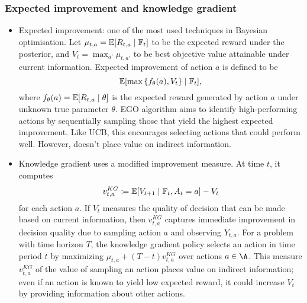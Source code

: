 \documentclass[11pt, openany]{book}
\begin{document}
\subsubsection{Expected improvement and knowledge gradient}
\begin{itemize}
    \item Expected improvement: one of the most used techniques in Bayesian optimisation. Let $\mu_{t,a} = \mathbb{E}[R_{t,a}\mid\mathbb{F}_t]$ to be the expected reward under the posterior, and $V_t = \max_{a'} \mu_{t,a'}$ to be best objective value attainable under current information. Expected improvement of action $a$ is defined to be
        \[
            \mathbb{E}[\max\left\lbrace f_\theta(a),V_t\right\rbrace\mid\mathbb{F}_t],
        \]
        where $f_\theta(a) = \mathbb{E}[R_{t,a}\mid\theta]$ is the expected reward generated by action $a$ under unknown true parameter $\theta$. EGO algorithm aims to identify high-performing actions by sequentially sampling those that yield the highest expected improvement. Like UCB, this encourages selecting actions that could perform well. However, doesn't place value on indirect information.
    \item Knowledge gradient uses a modified improvement measure. At time $t$, it computes
        \[
            v_{t,a}^{KG} \coloneq \mathbb{E}[V_{t+1}\mid\mathbb{F}_t,A_t=a] - V_t
        \]
    for each action $a$. If $V_t$ measures the quality of decision that can be made based on current information, then $v_{t,a}^{KG}$ captures immediate improvement in decision quality due to sampling action $a$ and observing $Y_{t,a}$. For a problem with time horizon $T$, the knowledge gradient policy selects an action in time period $t$ by maximizing $\mu_{t,a} + (T-t)v_{t,a}^{KG}$ over actions $a\in\A$. This measure $v_{t,a}^{KG}$ of the value of sampling an action places value on indirect information; even if an action is known to yield low expected reward, it could increase $V_t$ by providing information about other actions.
\end{itemize}
\end{document}

